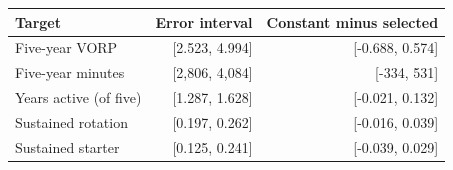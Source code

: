 \begin{tabular}{lrr}
\toprule
Target & Error interval & Constant minus selected \\
\midrule
Five-year VORP & [2.523, 4.994] & [-0.688, 0.574] \\
Five-year minutes & [2,806, 4,084] & [-334, 531] \\
Years active (of five) & [1.287, 1.628] & [-0.021, 0.132] \\
Sustained rotation & [0.197, 0.262] & [-0.016, 0.039] \\
Sustained starter & [0.125, 0.241] & [-0.039, 0.029] \\
\bottomrule
\end{tabular}